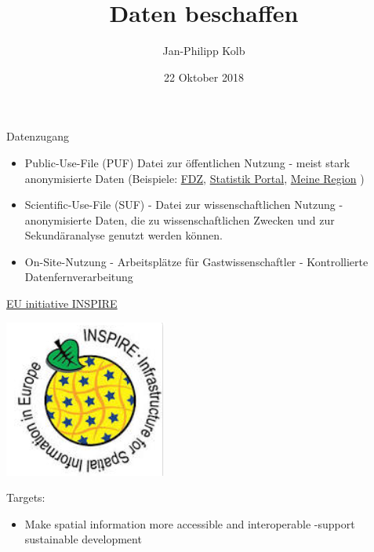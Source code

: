 \documentclass[ignorenonframetext,]{beamer}
\title{Daten beschaffen}
\author{Jan-Philipp Kolb}
\date{22 Oktober 2018}
\providecommand{\tightlist}{%
  \setlength{\itemsep}{0pt}\setlength{\parskip}{0pt}}
\begin{document}
\frame{\titlepage}

\begin{frame}{Datenzugang}
\protect\hypertarget{datenzugang}{}

\begin{itemize}
\item
  Public-Use-File (PUF) Datei zur öffentlichen Nutzung - meist stark
  anonymisierte Daten (Beispiele:
  \href{www.forschungsdatenzentrum.de}{FDZ},
  \href{www.statistik-portal.de}{Statistik Portal},
  \href{www.infothek.statistik.rlp.de/lis/MeineRegion/index.asp}{Meine
  Region} )
\item
  Scientific-Use-File (SUF) - Datei zur wissenschaftlichen Nutzung -
  anonymisierte Daten, die zu wissenschaftlichen Zwecken und zur
  Sekundäranalyse genutzt werden können.
\item
  On-Site-Nutzung - Arbeitsplätze für Gastwissenschaftler -
  Kontrollierte Datenfernverarbeitung
\end{itemize}

\end{frame}

\begin{frame}{\href{http://inspire.ec.europa.eu/reports/Registration_form.pdf}{EU
initiative INSPIRE}}
\protect\hypertarget{eu-initiative-inspire}{}

\includegraphics{figure/inspire.PNG}

\begin{block}{Targets:}

\begin{itemize}
\tightlist
\item
  Make spatial information more accessible and interoperable -support
  sustainable development
\end{itemize}

\end{block}

\end{frame}
\end{document}
